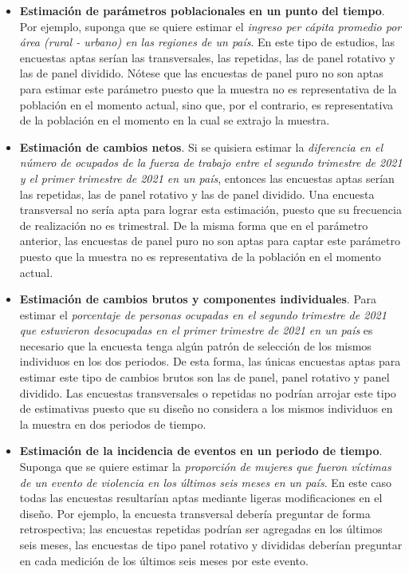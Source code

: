 \documentclass[
  12pt,
]{book}
\begin{document}
\begin{itemize}
\item
  \textbf{Estimación de parámetros poblacionales en un punto del tiempo}. Por ejemplo, suponga que se quiere estimar el \emph{ingreso per cápita promedio por área (rural - urbano) en las regiones de un país}. En este tipo de estudios, las encuestas aptas serían las transversales, las repetidas, las de panel rotativo y las de panel dividido. Nótese que las encuestas de panel puro no son aptas para estimar este parámetro puesto que la muestra no es representativa de la población en el momento actual, sino que, por el contrario, es representativa de la población en el momento en la cual se extrajo la muestra.
\item
  \textbf{Estimación de cambios netos}. Si se quisiera estimar la \emph{diferencia en el número de ocupados de la fuerza de trabajo entre el segundo trimestre de 2021 y el primer trimestre de 2021 en un país}, entonces las encuestas aptas serían las repetidas, las de panel rotativo y las de panel dividido. Una encuesta transversal no sería apta para lograr esta estimación, puesto que su frecuencia de realización no es trimestral. De la misma forma que en el parámetro anterior, las encuestas de panel puro no son aptas para captar este parámetro puesto que la muestra no es representativa de la población en el momento actual.
\item
  \textbf{Estimación de cambios brutos y componentes individuales}. Para estimar el \emph{porcentaje de personas ocupadas en el segundo trimestre de 2021 que estuvieron desocupadas en el primer trimestre de 2021 en un país} es necesario que la encuesta tenga algún patrón de selección de los mismos individuos en los dos periodos. De esta forma, las únicas encuestas aptas para estimar este tipo de cambios brutos son las de panel, panel rotativo y panel dividido. Las encuestas transversales o repetidas no podrían arrojar este tipo de estimativas puesto que su diseño no considera a los mismos individuos en la muestra en dos periodos de tiempo.
\item
  \textbf{Estimación de la incidencia de eventos en un periodo de tiempo}. Suponga que se quiere estimar la \emph{proporción de mujeres que fueron víctimas de un evento de violencia en los últimos seis meses en un país}. En este caso todas las encuestas resultarían aptas mediante ligeras modificaciones en el diseño. Por ejemplo, la encuesta transversal debería preguntar de forma retrospectiva; las encuestas repetidas podrían ser agregadas en los últimos seis meses, las encuestas de tipo panel rotativo y divididas deberían preguntar en cada medición de los últimos seis meses por este evento.

\end{itemize}
\end{document}
